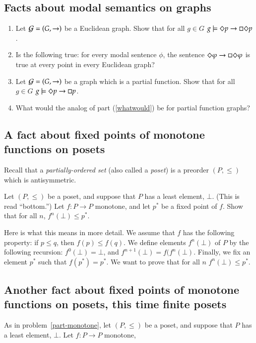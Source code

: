 \documentclass[12pt]{article}
\begin{document}
\subsection{Facts about modal semantics on graphs}
\begin{enumerate}
\item Let ${\cal G} = (G,\rightarrow)$ be a Euclidean graph.
Show that for all $g\in G$ $g\models \Diamond p\rightarrow \Box \Diamond p$.
\item Is the following true:  for every modal sentence $\phi$, the sentence 
$\Diamond \varphi \rightarrow \Box \Diamond \varphi$
is true at every point in every Euclidean graph?\label{whatwould}
\item 
 Let ${\cal G} = (G,\rightarrow)$ be a graph which is a partial function.
Show that for all $g\in G$ $g\models \Diamond p\rightarrow \Box  p$.
\item What would the analog of part (\ref{whatwould}) be for partial function graphs?



\end{enumerate}


\subsection{A fact about fixed points of monotone functions on posets}

Recall that a \emph{partially-ordered set} (also called a \emph{poset}) is a preorder $(P,\leq)$ which
is antisymmetric.

Let $(P,\leq)$ be a poset, and suppose that $P$ has a least element, $\bot$.
(This is read ``bottom.'') Let $f:P\to P$ monotone,
and let $p^*$ be a fixed point of $f$.   Show that for all $n$, $f^n(\bot) \leq p^*$.

Here is what this means in more detail.
We assume that $f$ has the following property: if $p\leq q$, then $f(p) \leq f(q)$.
We define elements $f^n(\bot)$ of $P$ by the following recursion:
$f^0(\bot) = \bot$, and $f^{n+1}(\bot) = f(f^n(\bot)$.
Finally, we fix an element $p^*$ such that $f(p^*)= p^*$.
We want to prove that for all $n$ $f^n(\bot) \leq p^*$.
\label{part-monotone}

\subsection{Another fact about fixed points of monotone functions on posets, this time finite posets}
\label{anotherfact}
As in problem~\ref{part-monotone}, let 
 $(P,\leq)$ be a poset, and suppose that $P$ has a least element, $\bot$.
Let $f:P\to P$ monotone,
\end{document}
